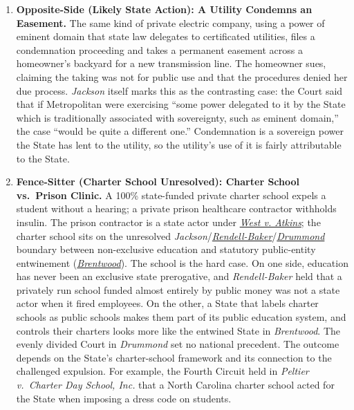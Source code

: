 \documentclass[12pt]{article}
\begin{document}
\begin{enumerate}
\item \textbf{Opposite-Side (Likely State Action): A Utility Condemns an Easement.} The same kind of private electric company, using a power of eminent domain that state law delegates to certificated utilities, files a condemnation proceeding and takes a permanent easement across a homeowner's backyard for a new transmission line. The homeowner sues, claiming the taking was not for public use and that the procedures denied her due process. \textit{Jackson} itself marks this as the contrasting case: the Court said that if Metropolitan were exercising ``some power delegated to it by the State which is traditionally associated with sovereignty, such as eminent domain,'' the case ``would be quite a different one.'' Condemnation is a sovereign power the State has lent to the utility, so the utility's use of it is fairly attributable to the State.

\item \textbf{Fence-Sitter (Charter School Unresolved): Charter School vs.\ Prison Clinic.} A 100\% state-funded private charter school expels a student without a hearing; a private prison healthcare contractor withholds insulin. The prison contractor is a state actor under \href{https://supreme.justia.com/cases/federal/us/487/42/}{\emph{West v. Atkins}}; the charter school sits on the unresolved \emph{Jackson}/\href{https://supreme.justia.com/cases/federal/us/457/830/}{\emph{Rendell-Baker}}/\href{https://www.law.cornell.edu/supct/cert/24-394}{\emph{Drummond}} boundary between non-exclusive education and statutory public-entity entwinement (\href{https://www.law.cornell.edu/supremecourt/text/531/288}{\emph{Brentwood}}). The school is the hard case. On one side, education has never been an exclusive state prerogative, and \textit{Rendell-Baker} held that a privately run school funded almost entirely by public money was not a state actor when it fired employees. On the other, a State that labels charter schools as public schools makes them part of its public education system, and controls their charters looks more like the entwined State in \textit{Brentwood}. The evenly divided Court in \textit{Drummond} set no national precedent. The outcome depends on the State's charter-school framework and its connection to the challenged expulsion. For example, the Fourth Circuit held in \textit{Peltier v.\ Charter Day School, Inc.} that a North Carolina charter school acted for the State when imposing a dress code on students.

\end{enumerate}
\end{document}
